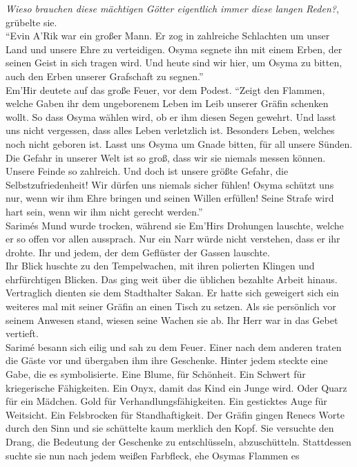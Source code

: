 \textit{Wieso brauchen diese mächtigen Götter eigentlich immer diese langen Reden?}, grübelte sie.\\
``Evin A'Rik war ein großer Mann. Er zog in zahlreiche Schlachten um unser Land und unsere Ehre 
zu verteidigen. Osyma segnete ihn mit einem Erben, der seinen Geist in sich tragen wird. Und heute 
sind wir hier, um Osyma zu bitten, auch den Erben unserer Grafschaft zu segnen.''\\
Em'Hir deutete auf das große Feuer, vor dem Podest. ``Zeigt den Flammen, welche Gaben ihr dem 
ungeborenem Leben im Leib unserer Gräfin schenken wollt. So dass Osyma wählen wird, ob er ihm 
diesen Segen gewehrt. Und lasst uns nicht vergessen, dass alles Leben verletzlich ist. Besonders 
Leben, welches noch nicht geboren ist. Lasst uns Osyma um Gnade bitten, für all unsere Sünden. 
Die Gefahr in unserer Welt ist so groß, dass wir sie niemals messen können. Unsere Feinde so 
zahlreich. Und doch ist unsere größte Gefahr, die Selbstzufriedenheit! Wir dürfen uns niemals 
sicher fühlen! Osyma schützt uns nur, wenn wir ihm Ehre bringen und seinen Willen erfüllen! 
Seine Strafe wird hart sein, wenn wir ihm nicht gerecht werden.''\\
Sarimés Mund wurde trocken, während sie Em'Hirs Drohungen lauschte, welche er so offen vor allen 
aussprach. Nur ein Narr würde nicht verstehen, dass er ihr drohte. Ihr und jedem, der dem 
Geflüster der Gassen lauschte. \\
Ihr Blick huschte zu den Tempelwachen, mit ihren polierten Klingen und ehrfürchtigen Blicken. Das 
ging weit über die üblichen bezahlte Arbeit hinaus. Vertraglich dienten sie dem Stadthalter 
Sakan. Er hatte sich geweigert sich ein weiteres mal mit seiner Gräfin an einen Tisch zu 
setzen. Als sie persönlich vor seinem Anwesen stand, wiesen seine Wachen sie ab. Ihr Herr war 
in das Gebet vertieft.\\
Sarimé besann sich eilig und sah zu dem Feuer. Einer nach dem anderen traten die Gäste vor und 
übergaben ihm ihre Geschenke. Hinter jedem steckte eine Gabe, die es symbolisierte. Eine Blume, für 
Schönheit. Ein Schwert für kriegerische Fähigkeiten. Ein Onyx, damit das Kind ein Junge wird. Oder 
Quarz für ein Mädchen. Gold für Verhandlungsfähigkeiten. Ein gesticktes Auge für Weitsicht. Ein 
Felsbrocken für Standhaftigkeit. Der Gräfin gingen Renecs Worte durch den Sinn und sie schüttelte 
kaum merklich den Kopf. Sie versuchte den Drang, die Bedeutung der Geschenke zu entschlüsseln, 
abzuschütteln. Stattdessen suchte sie nun nach jedem weißen Farbfleck, ehe Osymas Flammen es 
